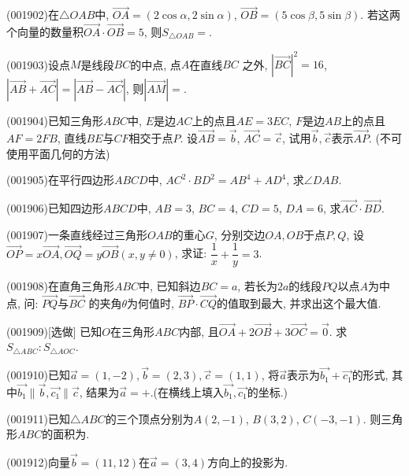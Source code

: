 \item (001902)在$\triangle OAB$中, $\overrightarrow{OA}=(2\cos\alpha,2\sin\alpha)$, $\overrightarrow{OB}=(5\cos\beta,5\sin\beta)$. 若这两个向量的数量积$\overrightarrow{OA}\cdot\overrightarrow{OB}=5$, 则$S_{\triangle OAB}=$.
\item (001903)设点$M$是线段$BC$的中点, 点$A$在直线$BC$ 之外, $|\overrightarrow{BC}|^2=16$, $|\overrightarrow{AB}+\overrightarrow{AC}|=|\overrightarrow{AB}-\overrightarrow{AC}|$, 则$|\overrightarrow{AM}|=$.
\item (001904)已知三角形$ABC$中, $E$是边$AC$上的点且$AE=3EC$, $F$是边$AB$上的点且$AF=2FB$, 直线$BE$与$CF$相交于点$P$. 设$\overrightarrow{AB}=\overrightarrow{b}$, $\overrightarrow{AC}=\overrightarrow{c}$, 试用$\overrightarrow{b},\overrightarrow{c}$表示$\overrightarrow{AP}$.
(不可使用平面几何的方法)
\item (001905)在平行四边形$ABCD$中, $AC^2\cdot BD^2=AB^4+AD^4$, 求$\angle DAB$.
\item (001906)已知四边形$ABCD$中, $AB=3$, $BC=4$, $CD=5$, $DA=6$, 求$\overrightarrow{AC}\cdot \overrightarrow{BD}$.
\item (001907)一条直线经过三角形$OAB$的重心$G$, 分别交边$OA,OB$于点$P,Q$,
设$\overrightarrow{OP}=x\overrightarrow{OA},\overrightarrow{OQ}=y\overrightarrow{OB}(x,y\neq 0)$, 求证: $\dfrac{1}{x}+\dfrac{1}{y}=3$.
\item (001908)在直角三角形$ABC$中, 已知斜边$BC=a$, 若长为$2a$的线段$PQ$以点$A$为中点, 问: $\overrightarrow{PQ}$与$\overrightarrow{BC}$ 的夹角$\theta$为何值时, $\overrightarrow{BP}\cdot\overrightarrow{CQ}$的值取到最大, 并求出这个最大值.
\item (001909)[选做]
已知$O$在三角形$ABC$内部,
且$\overrightarrow{OA}+2\overrightarrow{OB}+3\overrightarrow{OC}=\overrightarrow{0}$. 求$S_{\triangle ABC}:S_{\triangle AOC}$.
\item (001910)已知$\overrightarrow{a}=(1,-2),\overrightarrow{b}=(2,3),\overrightarrow{c}=(1,1)$, 将$\overrightarrow{a}$表示为$\overrightarrow{b_1}+\overrightarrow{c_1}$的形式,
其中$\overrightarrow{b_1}\parallel\overrightarrow{b},\overrightarrow{c_1}\parallel\overrightarrow{c}$, 结果为$\overrightarrow{a}=$$+$.(在横线上填入$\overrightarrow{b_1},\overrightarrow{c_1}$的坐标.)
\item (001911)已知$\triangle ABC$的三个顶点分别为$A(2,-1)$, $B(3,2)$, $C(-3,-1)$. 则三角形$ABC$的面积为.
\item (001912)向量$\overrightarrow{b}=(11,12)$在$\overrightarrow{a}=(3,4)$方向上的投影为.
